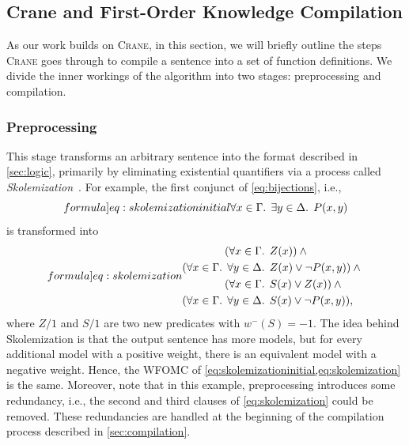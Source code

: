 \documentclass[a4paper,UKenglish,cleveref,autoref,table]{lipics-v2021}
\begin{document}
\subsection{Crane and First-Order Knowledge Compilation}\label{sec:crane}

As our work builds on \textsc{Crane}, in this section, we will briefly outline
the steps \textsc{Crane} goes through to compile a sentence into a set of
function definitions. We divide the inner workings of the algorithm into two
stages: preprocessing and compilation.

\subsubsection{Preprocessing}\label{sec:preprocessing}

This stage transforms an arbitrary sentence into the format described in
\cref{sec:logic}, primarily by eliminating existential quantifiers via a process
called \emph{Skolemization}~\cite{DBLP:conf/kr/BroeckMD14}. For example, the
first conjunct of \cref{eq:bijections}, i.e.,
\begin{equation}\label[formula]{eq:skolemizationinitial}
  \forall x \in \Gamma\text{. }\exists y \in \Delta\text{. } P(x, y)
\end{equation}
is transformed into
\begin{equation}\label[formula]{eq:skolemization}
  \begin{aligned}
    (\forall x \in \Gamma\text{. } &Z(x))\land{}\\
    (\forall x \in \Gamma\text{. } \forall y \in \Delta\text{. } &Z(x) \lor \neg P(x, y))\land{}\\
    (\forall x \in \Gamma\text{. } &S(x) \lor Z(x))\land{}\\
    (\forall x \in \Gamma\text{. } \forall y \in \Delta\text{. } &S(x) \lor \neg P(x, y)),
  \end{aligned}
\end{equation}
where $Z/1$ and $S/1$ are two new predicates with $w^{-}(S) = -1$. The idea
behind Skolemization is that the output sentence has more models, but for every
additional model with a positive weight, there is an equivalent model with a
negative weight. Hence, the WFOMC of
\cref{eq:skolemizationinitial,eq:skolemization} is the same. Moreover, note that
in this example, preprocessing introduces some redundancy, i.e., the second and
third clauses of \cref{eq:skolemization} could be removed. These redundancies
are handled at the beginning of the compilation process described in
\cref{sec:compilation}.
\end{document}
